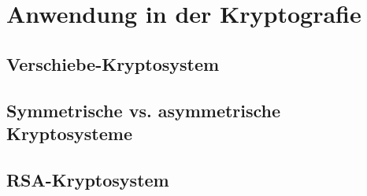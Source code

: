 \section{Anwendung in der Kryptografie}

\subsection{Verschiebe-Kryptosystem}

\subsection{Symmetrische vs. asymmetrische Kryptosysteme}

\subsection{RSA-Kryptosystem}

